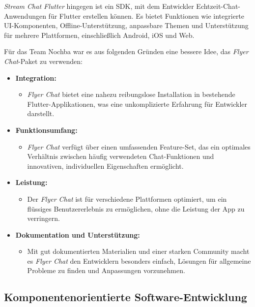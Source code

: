 \textit{Stream Chat Flutter} hingegen ist ein SDK, mit dem Entwickler Echtzeit-Chat-Anwendungen für Flutter erstellen können. Es bietet Funktionen wie integrierte UI-Komponenten, Offline-Unterstützung, anpassbare Themen und Unterstützung für mehrere Plattformen, einschließlich Android, iOS und Web.

Für das Team Nochba war es aus folgenden Gründen eine bessere Idee, das \textit{Flyer Chat}-Paket zu verwenden:

\begin{itemize}
  \item \textbf{Integration:}
        \begin{itemize}
          \item \textit{Flyer Chat} bietet eine nahezu reibungslose Installation in bestehende Flutter-Applikationen, was eine unkomplizierte Erfahrung für Entwickler darstellt.
        \end{itemize}
  \item \textbf{Funktionsumfang:}
        \begin{itemize}
          \item \textit{Flyer Chat} verfügt über einen umfassenden Feature-Set, das ein optimales Verhältnis zwischen häufig verwendeten Chat-Funktionen und innovativen, individuellen Eigenschaften ermöglicht.
        \end{itemize}
  \item \textbf{Leistung:}
        \begin{itemize}
          \item Der \textit{Flyer Chat} ist für verschiedene Plattformen optimiert, um ein flüssiges Benutzererlebnis zu ermöglichen, ohne die Leistung der App zu verringern.
        \end{itemize}
  \item \textbf{Dokumentation und Unterstützung:}
        \begin{itemize}
          \item Mit gut dokumentierten Materialien und einer starken Community macht es \textit{Flyer Chat} den Entwicklern besonders einfach, Lösungen für allgemeine Probleme zu finden und Anpassungen vorzunehmen.
        \end{itemize}
\end{itemize}

\subsection{Komponentenorientierte Software-Entwicklung}

